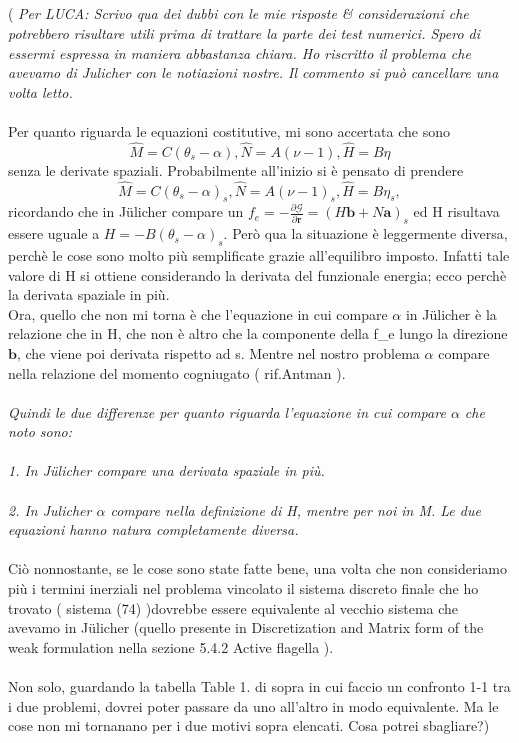 \\\\\\\\
( \emph{Per LUCA: Scrivo qua dei dubbi con le mie risposte & considerazioni che potrebbero risultare utili prima di trattare la parte dei test numerici. Spero di essermi espressa in maniera abbastanza chiara. Ho riscritto il problema che avevamo di Julicher con le notiazioni nostre.
Il commento si può cancellare una volta letto.}
\\\\
Per quanto riguarda le equazioni costitutive, mi sono accertata che sono
\[ \hat{M} = C(\theta_s -\alpha), \hat{N} = A(\nu - 1), \hat{H} = B\eta \]
senza le derivate spaziali. Probabilmente all'inizio si è pensato di prendere 
\[ \hat{M} = C(\theta_s -\alpha)_s, \hat{N} = A(\nu - 1)_s, \hat{H} = B\eta _s, \] 
ricordando che in Jülicher compare un
$f_e = -\frac{\partial \mathcal{G}}{\partial \mathbf{r}} = (H \mathbf{b} + N \mathbf{a})_s$
ed H risultava essere uguale a $H = - B(\theta_s - \alpha)_s$. Però qua la situazione è leggermente diversa, perchè le cose sono molto più semplificate grazie all'equilibro imposto.
Infatti tale valore di H si ottiene considerando la derivata del funzionale energia; ecco perchè la derivata spaziale in più.\\
Ora, quello che non mi torna è che l'equazione in cui compare $\alpha$ in Jülicher è la relazione che in H, che non è altro che la componente della f_e lungo la direzione $\mathbf{b}$, che viene poi derivata rispetto ad s. Mentre nel nostro problema $\alpha$ compare nella relazione del momento cogniugato ( rif.Antman ).
\\\\
\emph{Quindi le due differenze per quanto riguarda l'equazione in cui compare $\alpha$ che noto sono:}
\\\\
\emph{1. In Jülicher compare una derivata spaziale in più.}
\\\\
\emph{2. In Julicher $\alpha$ compare nella definizione di H, mentre per noi in M. Le due equazioni hanno natura completamente diversa.}
\\\\
Ciò nonnostante, se le cose sono state fatte bene, una volta che non consideriamo più i termini inerziali nel problema vincolato il sistema discreto finale che ho trovato ( sistema (74) )dovrebbe essere equivalente al vecchio sistema che avevamo in Jülicher (quello presente in Discretization and Matrix form of the weak formulation nella sezione 5.4.2 Active flagella ).
\\\\
Non solo, guardando la tabella Table 1. di sopra in cui faccio un confronto 1-1 tra i due problemi, dovrei poter passare da uno all'altro in modo equivalente. Ma le cose non mi tornanano per i due motivi sopra elencati. Cosa potrei sbagliare?) 





